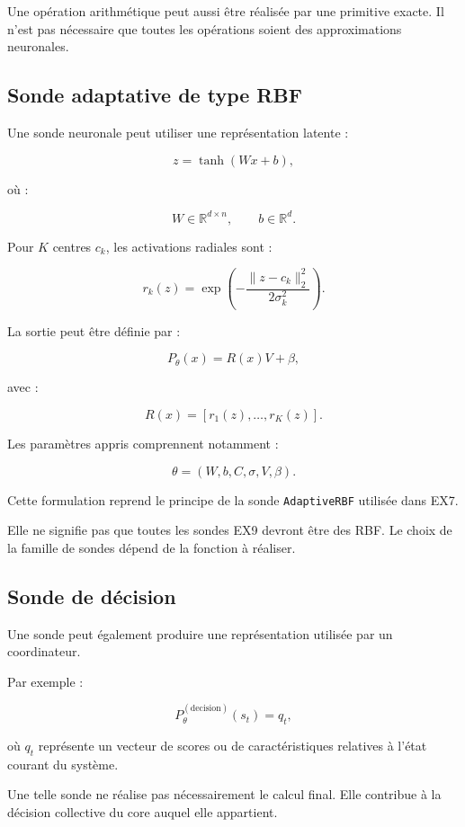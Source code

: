 \documentclass[11pt,a4paper]{article}
\begin{document}
Une opération arithmétique peut aussi être réalisée par une primitive
exacte. Il n'est pas nécessaire que toutes les opérations soient
des approximations neuronales.

\subsection{Sonde adaptative de type RBF}

Une sonde neuronale peut utiliser une représentation latente :

\[
z = \tanh(Wx+b),
\]

où :

\[
W\in\mathbb{R}^{d\times n},
\qquad
b\in\mathbb{R}^{d}.
\]

Pour $K$ centres $c_k$, les activations radiales sont :

\[
r_k(z)
=
\exp\left(
-\frac{\|z-c_k\|_2^2}{2\sigma_k^2}
\right).
\]

La sortie peut être définie par :

\[
P_{\theta}(x)
=
R(x)V+\beta,
\]

avec :

\[
R(x)=[r_1(z),\ldots,r_K(z)].
\]

Les paramètres appris comprennent notamment :

\[
\theta=(W,b,C,\sigma,V,\beta).
\]

Cette formulation reprend le principe de la sonde
\texttt{AdaptiveRBF} utilisée dans EX7.

Elle ne signifie pas que toutes les sondes EX9 devront être des RBF.
Le choix de la famille de sondes dépend de la fonction à réaliser.

\subsection{Sonde de décision}

Une sonde peut également produire une représentation utilisée
par un coordinateur.

Par exemple :

\[
P_{\theta}^{(\mathrm{decision})}(s_t)
=
q_t,
\]

où $q_t$ représente un vecteur de scores ou de caractéristiques
relatives à l'état courant du système.

Une telle sonde ne réalise pas nécessairement le calcul final.
Elle contribue à la décision collective du core auquel elle appartient.

\end{document}
